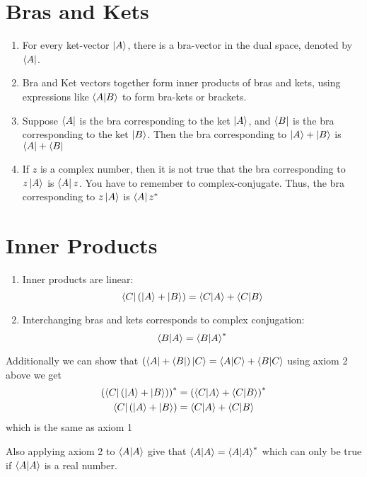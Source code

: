 \documentclass[12pt,a5paper]{article}
\begin{document}
\section{Bras and Kets}
\begin{enumerate}
	\item For every ket-vector $\ket{A}$, there is a bra-vector in the dual space, denoted by $\bra{A}$.
	\item Bra and Ket vectors together form inner products of bras and kets, using expressions like $\braket{A}{B}$ to form bra-kets or brackets.
	\item Suppose $\bra{A}$ is the bra corresponding to the ket $\ket{A}$, and $\bra{B}$ is the bra corresponding to the ket $\ket{B}$. Then the bra corresponding to $\ket{A}+\ket{B}$ is $\bra{A}+\bra{B}$
	\item If $z$ is a complex number, then it is not true that the bra corresponding to $z\ket{A}$ is $\bra{A}z$. You have to remember to complex-conjugate. Thus, the bra corresponding to $z\ket{A}$ is $\bra{A}z^{*}$
\end{enumerate}
\section{Inner Products}
\begin{enumerate}
\item Inner products are linear: 
\begin{equation}
        \bra{C}\left( \ket{A} + \ket{B} \right) = \braket{C}{A} + \braket{C}{B}
\end{equation}
\item  Interchanging bras and kets corresponds to complex conjugation:
\begin{equation}
	\braket{B}{A} = \braket{B}{A}^{*}
\end{equation}
\end{enumerate}
Additionally we can show that $\left(\bra{A}+\bra{B}\right)\ket{C} = \braket{A}{C}+\braket{B}{C}$ using axiom 2 above we get     \begin{align}
	\left(\bra{C}\left(\ket{A}+\ket{B}\right)\right)^{*}&=\left(\braket{C}{A} + \braket{C}{B}\right)^{*}\\
	\bra{C}\left(\ket{A}+\ket{B}\right)&=\braket{C}{A} + \braket{C}{B}
 \end{align}
which is the same as axiom 1

Also applying axiom 2 to $\braket{A}{A}$ give that $\braket{A}{A} = \braket{A}{A}^{*}$ which can only be true if $\braket{A}{A}$ is a real number.
\end{document}
